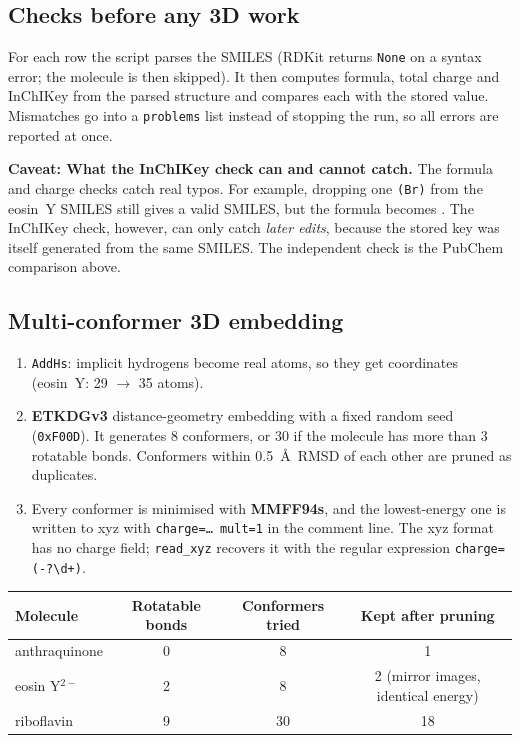 \documentclass[11pt,a4paper]{article}
\newcommand{\notehead}[2]{\par\smallskip\noindent\textbf{#1: #2.}\enspace}
\begin{document}
\subsection{Checks before any 3D work}
For each row the script parses the SMILES (RDKit returns \texttt{None} on a syntax error; the
molecule is then skipped). It then computes formula, total charge and InChIKey from the parsed
structure and compares each with the stored value. Mismatches go into a \texttt{problems} list
instead of stopping the run, so all errors are reported at once.

\notehead{Caveat}{What the InChIKey check can and cannot catch}
The formula and charge checks catch real typos. For example, dropping one \texttt{(Br)} from the
eosin~Y SMILES still gives a valid SMILES, but the formula becomes . The
InChIKey check, however, can only catch \emph{later edits}, because the stored key was itself
generated from the same SMILES. The independent check is the PubChem comparison above.
\par\smallskip

\subsection{Multi-conformer 3D embedding}
\begin{enumerate}
  \item \texttt{AddHs}: implicit hydrogens become real atoms, so they get coordinates
  (eosin~Y: 29 $\to$ 35 atoms).
  \item \textbf{ETKDGv3} distance-geometry embedding with a fixed random seed
  (\texttt{0xF00D}). It generates 8 conformers, or 30 if the molecule has more than 3 rotatable
  bonds. Conformers within 0.5~\AA\ RMSD of each other are pruned as duplicates.
  \item Every conformer is minimised with \textbf{MMFF94s}, and the lowest-energy one is written
  to xyz with \texttt{charge=\ldots\ mult=1} in the comment line. The xyz format has no charge
  field; \texttt{read\_xyz} recovers it with the regular expression \verb|charge=(-?\d+)|.
\end{enumerate}

\begin{center}\small
\begin{tabular}{@{}lccc@{}}
\toprule
Molecule & Rotatable bonds & Conformers tried & Kept after pruning \\
\midrule
anthraquinone & 0 & 8 & 1 \\
eosin Y$^{2-}$ & 2 & 8 & 2 (mirror images, identical energy) \\
riboflavin & 9 & 30 & 18 \\
\bottomrule
\end{tabular}
\end{center}
\end{document}
